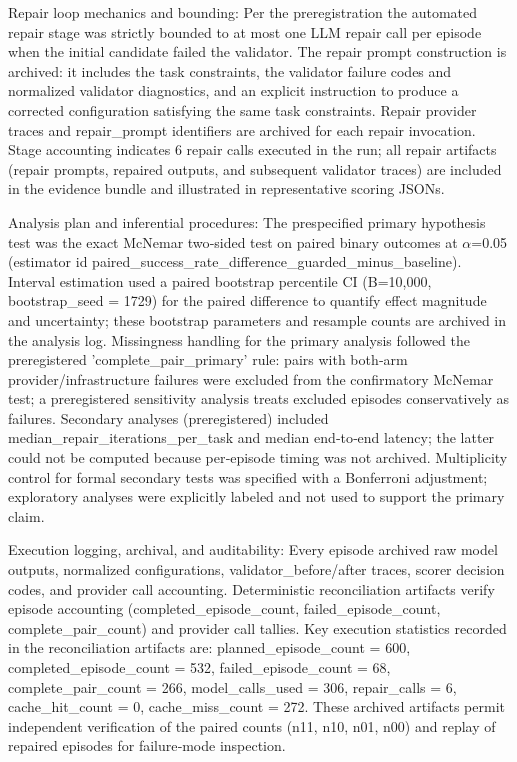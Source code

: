 \documentclass[conference]{IEEEtran}
\begin{document}
Repair loop mechanics and bounding: Per the preregistration the automated repair stage was strictly bounded to at most one LLM repair call per episode when the initial candidate failed the validator. The repair prompt construction is archived: it includes the task constraints, the validator failure codes and normalized validator diagnostics, and an explicit instruction to produce a corrected configuration satisfying the same task constraints. Repair provider traces and repair\_prompt identifiers are archived for each repair invocation. Stage accounting indicates 6 repair calls executed in the run; all repair artifacts (repair prompts, repaired outputs, and subsequent validator traces) are included in the evidence bundle and illustrated in representative scoring JSONs.

Analysis plan and inferential procedures: The prespecified primary hypothesis test was the exact McNemar two‑sided test on paired binary outcomes at \ensuremath{\alpha}=0.05 (estimator id paired\_success\_rate\_difference\_guarded\_minus\_baseline). Interval estimation used a paired bootstrap percentile CI (B=10,000, bootstrap\_seed = 1729) for the paired difference to quantify effect magnitude and uncertainty; these bootstrap parameters and resample counts are archived in the analysis log. Missingness handling for the primary analysis followed the preregistered 'complete\_pair\_primary' rule: pairs with both‑arm provider/infrastructure failures were excluded from the confirmatory McNemar test; a preregistered sensitivity analysis treats excluded episodes conservatively as failures. Secondary analyses (preregistered) included median\_repair\_iterations\_per\_task and median end‑to‑end latency; the latter could not be computed because per‑episode timing was not archived. Multiplicity control for formal secondary tests was specified with a Bonferroni adjustment; exploratory analyses were explicitly labeled and not used to support the primary claim.

Execution logging, archival, and auditability: Every episode archived raw model outputs, normalized configurations, validator\_before/after traces, scorer decision codes, and provider call accounting. Deterministic reconciliation artifacts verify episode accounting (completed\_episode\_count, failed\_episode\_count, complete\_pair\_count) and provider call tallies. Key execution statistics recorded in the reconciliation artifacts are: planned\_episode\_count = 600, completed\_episode\_count = 532, failed\_episode\_count = 68, complete\_pair\_count = 266, model\_calls\_used = 306, repair\_calls = 6, cache\_hit\_count = 0, cache\_miss\_count = 272. These archived artifacts permit independent verification of the paired counts (n11, n10, n01, n00) and replay of repaired episodes for failure‑mode inspection.
\end{document}
